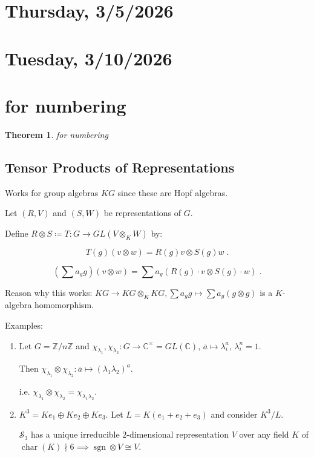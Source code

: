\documentclass{article}
\theoremstyle{definition}
\theoremstyle{plain}
\newtheorem{theorem}{Theorem}[section]
\theoremstyle{remark}
\begin{document}
    \section*{Thursday, 3/5/2026}

    \section*{Tuesday, 3/10/2026}
    
    \section{for numbering}

    \begin{theorem}
        for numbering
    \end{theorem}

    \subsection*{Tensor Products of Representations}

    Works for group algebras \(KG\) since these are Hopf algebras.

    Let \((R,V)\) and \((S,W)\) be representations of \(G\).

    Define \(R \otimes S \coloneqq T : G \to GL(V \otimes_K W)\) by:

    \[
        T(g)(v \otimes w) = R(g)v \otimes S(g) w\;.
    \]

    \[
        \left( \sum a_g g \right) (v \otimes w) = \sum a_g \left( R(g) \cdot v \otimes S(g) \cdot w \right) \;.
    \]

    Reason why this works: \(KG \to KG \otimes_K KG, \sum a_g g \mapsto \sum a_g(g \otimes g)\) is a \(K\)-algebra homomorphism.

    Examples:

    \begin{enumerate}[label=\arabic*)]
        \item Let \(G = \mathbb{Z} / n\mathbb{Z}\) and \(\chi_{\lambda_1} , \chi_{\lambda_2} : G \to \mathbb{C}^\times = GL(\mathbb{C})\), \(\overline{a} \mapsto \lambda_i^a\), \(\lambda_i^n = 1\).
        
        Then \(\chi_{\lambda_1} \otimes \chi_{\lambda_2} : \overline{a} \mapsto (\lambda_1 \lambda_2)^a\).

        i.e. \(\chi_{\lambda_1} \otimes \chi_{\lambda_2} = \chi_{\lambda_1 \lambda_2}\).

        \item \(K^3 = Ke_1 \oplus Ke_2 \oplus Ke_3\). Let \(L = K(e_1 + e_2 + e_3)\) and consider \(K^3 / L\).
        
        \(\mathscr{S}_3\) has a unique irreducible \(2\)-dimensional representation \(V\) over any field \(K\) of \(\operatorname{char}(K) \nmid 6 \implies \operatorname{sgn} \otimes V \cong V\).
    \end{enumerate} 
\end{document}
